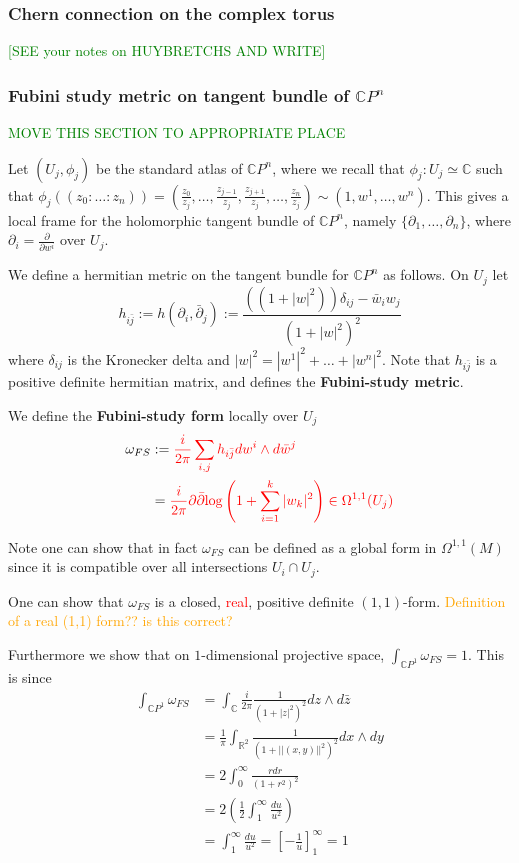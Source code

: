 \documentclass[a4paper]{article}
\theoremstyle{definition} \newtheorem*{definition}{Definition}
\theoremstyle{definition} \newtheorem*{definitions}{Definitions}
\theoremstyle{plain} \newtheorem{theorem}{Theorem}[section]
\theoremstyle{plain} \newtheorem{proposition}[theorem]{Proposition}
\theoremstyle{plain} \newtheorem{corollary}[theorem]{Corollary}
\theoremstyle{plain} \newtheorem{lemma}[theorem]{Lemma}
\theoremstyle{plain} \newtheorem{example}[theorem]{Example}
\newcommand{\checkCorrect}[1]{\textcolor{red}{#1}}
\newcommand{\question}[1]{\textcolor{orange}{#1}}
\newcommand{\finish}[1]{\textcolor{green}{#1}}
\newcommand{\defn}[1]{\textbf{#1}}
\newcommand{\realnos}{\mathbb{R}}
\newcommand{\complexnos}{\mathbb{C}}
\begin{document}
\subsubsection{Chern connection on the complex torus}
\finish{[SEE your notes on HUYBRETCHS AND WRITE]}


\subsubsection{Fubini study metric on tangent bundle of $\complexnos P^n$}
\finish{MOVE THIS SECTION TO APPROPRIATE PLACE}

Let $(U_j, \phi_j)$ be the standard atlas of $\complexnos P^n$, where we recall that $\phi_j:U_j\simeq \complexnos$ such that $\phi_j((z_0 : \ldots : z_n))=(\frac{z_0}{z_j}, \ldots, \frac{z_{j-1}}{z_j}, \frac{z_{j+1}}{z_j}, \ldots, \frac{z_n}{z_j})\sim (1, w^1, \ldots, w^n)$. This gives a local frame for the holomorphic tangent bundle of $\complexnos P^n$, namely $\{\partial_1, \ldots, \partial_n\}$, where $\partial_i=\frac{\partial}{\partial w^i}$ over $U_j$. 

We define a hermitian metric on the tangent bundle for $\complexnos P^n$ as follows. On $U_j$ let
$$h_{i\bar{j}}:=h(\partial_i,\bar{\partial}_j):=\frac{((1+|w|^2))\delta_{ij}-\bar{w}
_i w_j}{(1+|w|^2)^2}$$
where $\delta_{ij}$ is the Kronecker delta and $|w|^2 = |w^1|^2 + \ldots + |w^n|^2$. Note that $h_{i\bar{j}}$ is a positive definite hermitian matrix, and defines the \defn{Fubini-study metric}. 

We define the \defn{Fubini-study form} locally over $U_j$
\begin{align*}
    \omega_{FS} & := \checkCorrect{\frac{i}{2\pi} \sum_{i, j} h_{i\bar{j}} dw^i \wedge d\bar{w}^j} \\
 & = \checkCorrect{ \frac{i}{2\pi} \partial \bar{\partial} \text{log} \left( 1 + \sum_{i=1}^k |w_k|^2  \right) \in \Omega^{1,1}(U_j)} 
\end{align*}


Note one can show that in fact $\omega_{FS}$ can be defined as a global form in $\Omega^{1,1}(M)$ since it is compatible over all intersections $U_i\cap U_j$. 

One can show that $\omega_{FS}$ is a closed, \checkCorrect{real}, positive definite $(1,1)$-form. \question{Definition of a real (1,1) form?? is this correct?} 

Furthermore we show that on $1$-dimensional projective space, $\int_{\complexnos P^1} \omega_{FS}=1$. This is since
\begin{align*}
  \int_{\complexnos P^1} \omega_{FS} & = \int_\complexnos \frac{i}{2\pi}\frac{1}{(1+|z|^2)^2}dz\wedge d\bar{z}\\
  & = \frac{1}{\pi}\int_{\realnos^2}\frac{1}{(1+||(x,y)||^2)^2}dx\wedge dy \\
  & = 2 \int_0^\infty \frac{rdr}{(1+r^2)^2} \\
  & = 2 \left( \frac{1}{2} \int_1^\infty \frac{du}{u^2 }\right) \\
  & = \int_1^\infty \frac{du}{u^2}  = \left[ - \frac{1}{u} \right]_1^\infty = 1
\end{align*}
\end{document}
